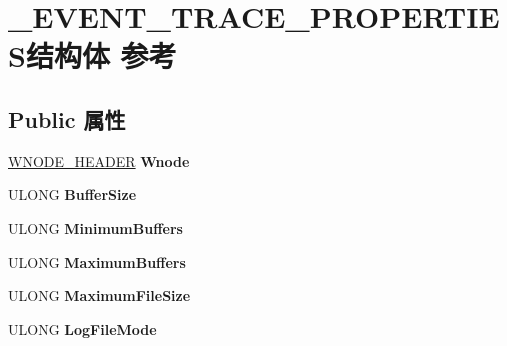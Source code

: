 \hypertarget{struct___e_v_e_n_t___t_r_a_c_e___p_r_o_p_e_r_t_i_e_s}{}\section{\+\_\+\+E\+V\+E\+N\+T\+\_\+\+T\+R\+A\+C\+E\+\_\+\+P\+R\+O\+P\+E\+R\+T\+I\+E\+S结构体 参考}
\label{struct___e_v_e_n_t___t_r_a_c_e___p_r_o_p_e_r_t_i_e_s}
\subsection*{Public 属性}
\begin{DoxyCompactItemize}
\item 
\mbox{\label{struct___e_v_e_n_t___t_r_a_c_e___p_r_o_p_e_r_t_i_e_s_a43bd166b37b6fa07d8b13b39c93c7aa2}} 
\hyperlink{struct___w_n_o_d_e___h_e_a_d_e_r}{W\+N\+O\+D\+E\+\_\+\+H\+E\+A\+D\+ER} {\bfseries Wnode}
\item 
\mbox{\label{struct___e_v_e_n_t___t_r_a_c_e___p_r_o_p_e_r_t_i_e_s_a4339e8f73e6559bb80cfe3c6784f9f09}} 
U\+L\+O\+NG {\bfseries Buffer\+Size}
\item 
\mbox{\label{struct___e_v_e_n_t___t_r_a_c_e___p_r_o_p_e_r_t_i_e_s_a04c670a4fc174da44a2d4438a7460a7e}} 
U\+L\+O\+NG {\bfseries Minimum\+Buffers}
\item 
\mbox{\label{struct___e_v_e_n_t___t_r_a_c_e___p_r_o_p_e_r_t_i_e_s_a730b9e8861c8abd874f468f8497f4397}} 
U\+L\+O\+NG {\bfseries Maximum\+Buffers}
\item 
\mbox{\label{struct___e_v_e_n_t___t_r_a_c_e___p_r_o_p_e_r_t_i_e_s_a5f57a2f235782f84cbd00dacfadf44bc}} 
U\+L\+O\+NG {\bfseries Maximum\+File\+Size}
\item 
\mbox{\label{struct___e_v_e_n_t___t_r_a_c_e___p_r_o_p_e_r_t_i_e_s_ae4a6feb1efe6889728e1fe43509ffe59}} 
U\+L\+O\+NG {\bfseries Log\+File\+Mode}

\end{DoxyCompactItemize}
